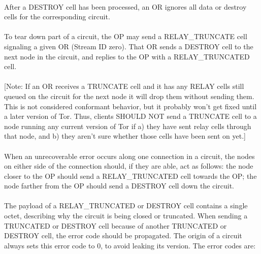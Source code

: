 \paragraph{}
After a DESTROY cell has been processed, an OR ignores all data or
destroy cells for the corresponding circuit.

\paragraph{}
To tear down part of a circuit, the OP may send a RELAY\_TRUNCATE cell
signaling a given OR (Stream ID zero). That OR sends a DESTROY
cell to the next node in the circuit, and replies to the OP with a
RELAY\_TRUNCATED cell.

\paragraph{}
[Note: If an OR receives a TRUNCATE cell and it has any RELAY cells
still queued on the circuit for the next node it will drop them
without sending them. This is not considered conformant behavior,
but it probably won't get fixed until a later version of Tor. Thus,
clients SHOULD NOT send a TRUNCATE cell to a node running any current
version of Tor if a) they have sent relay cells through that node,
and b) they aren't sure whether those cells have been sent on yet.]

\paragraph{}
When an unrecoverable error occurs along one connection in a
circuit, the nodes on either side of the connection should, if they
are able, act as follows: the node closer to the OP should send a
RELAY\_TRUNCATED cell towards the OP; the node farther from the OP
should send a DESTROY cell down the circuit.

\paragraph{}
The payload of a RELAY\_TRUNCATED or DESTROY cell contains a single octet,
describing why the circuit is being closed or truncated. When sending a
TRUNCATED or DESTROY cell because of another TRUNCATED or DESTROY cell,
the error code should be propagated. The origin of a circuit always sets
this error code to 0, to avoid leaking its version. The error codes are:


